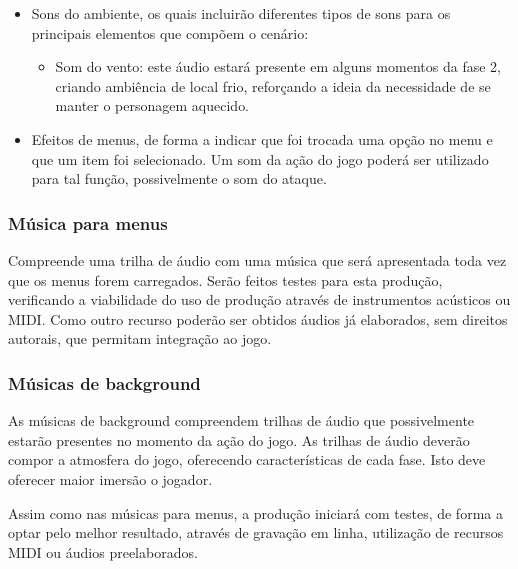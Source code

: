 \begin{itemize}
\item Sons do ambiente, os quais incluirão diferentes tipos de sons para os
principais elementos que compõem o cenário:
\begin{itemize}
\subitem Som do ar: som ativado para extinguir a chama da tocha. 
\subitem Som dos pássaros nas arvores: som ativado em alguns lugares da floresta 
do jogo 
\subitem Som da agua do rio: Este é ativado ao momento que o personagem chega 
perto do rio na primeira fase.
\subitem Som de pedras caindo: este som é ativado no momento que o personagem 
começa a trilha da primeira fase é se encontra como o primeiro objetivo do 
nível que é descer uma montanha pulando pedras as quais vai caído.
\subitem Som de fogo: este som  é ativado ao momento de que o personagem 
acenda a tocha.
\item Som do vento: este áudio estará presente em alguns momentos da fase 2, 
criando ambiência de local frio, reforçando a ideia da necessidade de se 
manter o personagem aquecido.
\end{itemize}

\item Efeitos de menus, de forma a indicar que foi trocada uma opção no 
menu e que um item foi selecionado. Um som da ação do jogo poderá ser
 utilizado para tal função, possivelmente o som do ataque.
\end{itemize}

\subsubsection{Música para menus}
Compreende uma trilha de áudio com uma música que será apresentada toda
 vez que os menus forem carregados. Serão feitos testes para esta produção, 
verificando a viabilidade do uso de produção através de instrumentos
 acústicos ou MIDI. Como outro recurso poderão ser obtidos áudios já
 elaborados, sem direitos autorais, que permitam integração ao jogo.

\subsubsection{Músicas de background}
As músicas de background compreendem trilhas de áudio que possivelmente
 estarão presentes no momento da ação do jogo. As trilhas de áudio 
deverão compor a atmosfera do jogo, oferecendo características de 
cada fase. Isto deve oferecer maior imersão o jogador.

Assim como nas músicas para menus, a produção iniciará com testes, de 
forma a optar pelo melhor resultado, através de gravação em linha,
 utilização de recursos MIDI ou áudios preelaborados.
